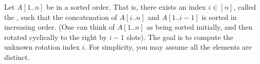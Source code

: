 \documentclass[10pt]{article}
\begin{document}





Let $A[1..n]$ be in a  sorted order. That is, there exists an index $i \in [n]$, called the , such that the concatenation of $A[i..n]$ and $A[1..i - 1]$ is sorted in increasing order. (One can think of $A[1..n]$ as being sorted initially, and then rotated cyclically to the right by $i - 1$ slots). The goal is to compute the unknown rotation index $i$. For simplicity, you may assume all the elements are distinct.
\end{document}
